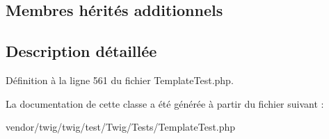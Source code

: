 \subsection*{Membres hérités additionnels}


\subsection{Description détaillée}


Définition à la ligne 561 du fichier Template\+Test.\+php.



La documentation de cette classe a été générée à partir du fichier suivant \+:\begin{DoxyCompactItemize}
\item 
vendor/twig/twig/test/\+Twig/\+Tests/Template\+Test.\+php\end{DoxyCompactItemize}
